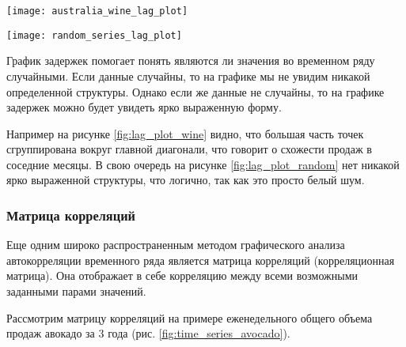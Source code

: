 \begin{center}
    \begin{minipage}{0.45\textwidth}
        \centering
        \texttt{[image: australia\_wine\_lag\_plot]}
        \label{fig:lag_plot_wine}
    \end{minipage}
    \hfill
    \begin{minipage}{0.45\textwidth}
        \centering
        \texttt{[image: random\_series\_lag\_plot]}
        \label{fig:lag_plot_random}
    \end{minipage}
\end{center}

График задержек помогает понять являются ли значения во временном ряду случайными. Если 
данные случайны, то на графике мы не увидим никакой определенной структуры. Однако 
если же данные не случайны, то на графике задержек можно будет увидеть ярко 
выраженную форму. 

Например на рисунке \ref{fig:lag_plot_wine} видно, что большая часть точек 
сгруппирована вокруг главной диагонали, что говорит о схожести продаж в соседние месяцы. 
В свою очередь на рисунке \ref{fig:lag_plot_random} нет никакой ярко выраженной 
структуры, что логично, так как это просто белый шум. \\

\subsubsection{Матрица корреляций}

Еще одним широко распространенным методом графического анализа автокорреляции 
временного ряда является матрица корреляций (корреляционная матрица). Она отображает в 
себе корреляцию между всеми возможными заданными парами значений.

Рассмотрим матрицу корреляций на примере еженедельного общего объема продаж авокадо 
за 3 года (рис. \ref{fig:time_series_avocado}).

